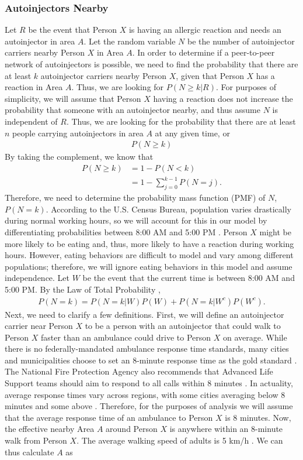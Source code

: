 \subsubsection{Autoinjectors Nearby} \label{autoinjectors-nearby}

Let $R$ be the event that Person $X$ is having an allergic reaction and needs an autoinjector in area $A$. Let the random variable $N$ be the number of autoinjector carriers nearby Person $X$ in Area $A$. In order to determine if a peer-to-peer network of autoinjectors is possible, we need to find the probability that there are at least $k$ autoinjector carriers nearby Person $X$, given that Person $X$ has a reaction in Area $A$. Thus, we are looking for $P(N \geq k|R)$. For purposes of simplicity, we will assume that Person $X$ having a reaction does not increase the probability that someone with an autoinjector nearby, and thus assume $N$ is independent of $R$. Thus, we are looking for the probability that there are at least $n$ people carrying autoinjectors in area $A$ at any given time, or
\begin{align*}
    P(N \geq k)
\end{align*}
By taking the complement, we know that
\begin{align*}
    P(N \geq k) &= 1 - P(N < k) \\
    &= 1 - \sum_{j=0}^{k-1}P(N=j).
\end{align*}
Therefore, we need to determine the probability mass function (PMF) of $N$, $P(N=k)$. According to the U.S. Census Bureau, population varies drastically during normal working hours, so we will account for this in our model by differentiating probabilities between 8:00 AM and 5:00 PM \cite{acs}. Person $X$ might be more likely to be eating and, thus, more likely to have a reaction during working hours. However, eating behaviors are difficult to model and vary among different populations; therefore, we will ignore eating behaviors in this model and assume independence. Let $W$ be the event that the current time is between 8:00 AM and 5:00 PM. By the Law of Total Probability \cite{blitz},
\begin{align*}
    P(N=k) = P(N=k|W)P(W)+ P(N=k|W^c)P(W^c).
\end{align*}
Next, we need to clarify a few definitions. First, we will define an autoinjector carrier near Person $X$ to be a person with an autoinjector that could walk to Person $X$ faster than an ambulance could drive to Person $X$ on average. While there is no federally-mandated ambulance response time standards, many cities and municipalities choose to set an 8-minute response time as the gold standard \cite{ems}. The National Fire Protection Agency also recommends that Advanced Life Support teams should aim to respond to all calls within 8 minutes \cite{nfpa}. In actuality, average response times vary across regions, with some cities averaging below 8 minutes and some above \cite{nycems}\cite{bostonems}.  Therefore, for the purposes of analysis we will assume that the average response time of an ambulance to Person $X$ is 8 minutes. Now, the effective nearby Area $A$ around Person $X$ is anywhere within an 8-minute walk from Person $X$. The average walking speed of adults is 5 km/h \cite{walking}. We can thus calculate $A$ as
